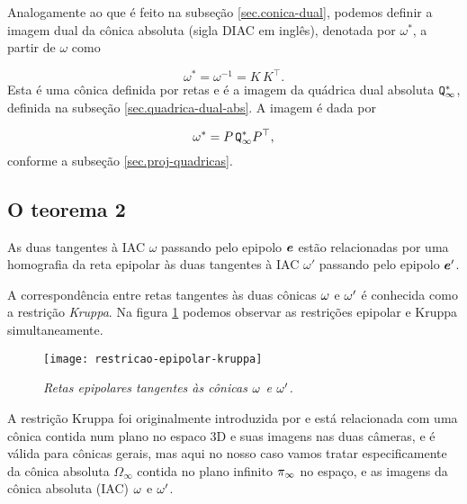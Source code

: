 Analogamente ao que é feito na subseção \ref{sec.conica-dual}, podemos definir a imagem dual da cônica absoluta (sigla DIAC em inglês), denotada por $\omega^*$, a partir de $\omega$ como

\begin{equation*}
\omega^*=\omega^{-1}=K\,K^\top.
\end{equation*}
Esta é uma cônica definida por retas e é a imagem da quádrica dual absoluta ${\tt Q^*_\infty}$, definida na subseção \ref{sec.quadrica-dual-abs}. A imagem é dada por

\begin{equation*}
\omega^*=P\,{\tt Q^*_\infty}P^\top,
\end{equation*}
conforme a subseção \ref{sec.proj-quadricas}.\\

\subsection{O teorema 2}\label{sec.teorema-2}

\begin{teorema}
As duas tangentes à IAC $\omega$ passando pelo epipolo $\boldsymbol{e}$ estão relacionadas por uma homografia da reta epipolar às duas tangentes à IAC $\omega'$ passando pelo epipolo $\boldsymbol{e}'$.
\end{teorema}

A correspondência entre retas tangentes às duas cônicas ${\bf \omega}$ e ${\bf \omega'}$ é conhecida como a restrição \textit{Kruppa}. Na figura \ref{epipolar-kruppa} podemos observar as restrições epipolar e Kruppa simultaneamente.

\begin{figure}[!htb]
\centering
\texttt{[image: restricao-epipolar-kruppa]}
\caption{\textit{Retas epipolares tangentes às cônicas ${\bf \omega}$ e ${\bf \omega'}$.}}
\label{epipolar-kruppa}
\end{figure}

A restrição Kruppa foi originalmente introduzida por \cite{faugeras92} e está relacionada com uma cônica contida num plano no espaco 3D e suas imagens nas duas câmeras, e é válida para cônicas gerais, mas aqui no nosso caso vamos tratar especificamente da cônica absoluta $\Omega_\infty$ contida no plano infinito $\pi_\infty$ no espaço, e as imagens da cônica absoluta (IAC) ${\bf \omega}$ e ${\bf \omega'}$.


